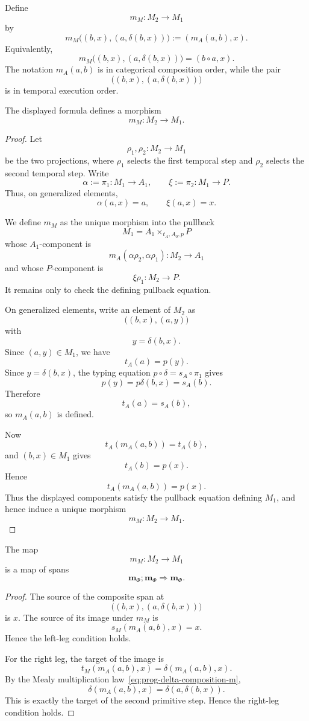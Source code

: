 Define
\[
m_M:M_2\to M_1
\]
by
\[
m_M\bigl((b,x),(a,\delta(b,x))\bigr)
:=
(m_A(a,b),x).
\]
Equivalently,
\[
m_M\bigl((b,x),(a,\delta(b,x))\bigr)
=
(b\circ a,x).
\]
The notation \(m_A(a,b)\) is in categorical composition order, while the pair
\[
\bigl((b,x),(a,\delta(b,x))\bigr)
\]
is in temporal execution order.

\begin{lemma}
\label{lem:program-multiplication-well-defined}
The displayed formula defines a morphism
\[
m_M:M_2\to M_1.
\]
\end{lemma}

\begin{proof}
Let
\[
\rho_1,\rho_2:M_2\to M_1
\]
be the two projections, where \(\rho_1\) selects the first temporal step and \(\rho_2\) selects the second temporal step. Write
\[
\alpha:=\pi_1:M_1\to A_1,
\qquad
\xi:=\pi_2:M_1\to P.
\]
Thus, on generalized elements,
\[
\alpha(a,x)=a,
\qquad
\xi(a,x)=x.
\]

We define \(m_M\) as the unique morphism into the pullback
\[
M_1=A_1\times_{t_A,A_0,p}P
\]
whose \(A_1\)-component is
\[
m_A(\alpha\rho_2,\alpha\rho_1):M_2\to A_1
\]
and whose \(P\)-component is
\[
\xi\rho_1:M_2\to P.
\]
It remains only to check the defining pullback equation.

On generalized elements, write an element of \(M_2\) as
\[
\bigl((b,x),(a,y)\bigr)
\]
with
\[
y=\delta(b,x).
\]
Since \((a,y)\in M_1\), we have
\[
t_A(a)=p(y).
\]
Since \(y=\delta(b,x)\), the typing equation \(p\circ\delta=s_A\circ\pi_1\) gives
\[
p(y)=p\delta(b,x)=s_A(b).
\]
Therefore
\[
t_A(a)=s_A(b),
\]
so \(m_A(a,b)\) is defined.

Now
\[
t_A(m_A(a,b))=t_A(b),
\]
and \((b,x)\in M_1\) gives
\[
t_A(b)=p(x).
\]
Hence
\[
t_A(m_A(a,b))=p(x).
\]
Thus the displayed components satisfy the pullback equation defining \(M_1\), and hence induce a unique morphism
\[
m_M:M_2\to M_1.
\]
\end{proof}

\begin{proposition}
\label{prop:program-multiplication-span-map}
The map
\[
m_M:M_2\to M_1
\]
is a map of spans
\[
\mathbf m_\Phi;\mathbf m_\Phi
\Longrightarrow
\mathbf m_\Phi.
\]
\end{proposition}

\begin{proof}
The source of the composite span at
\[
\bigl((b,x),(a,\delta(b,x))\bigr)
\]
is \(x\). The source of its image under \(m_M\) is
\[
s_M(m_A(a,b),x)=x.
\]
Hence the left-leg condition holds.

For the right leg, the target of the image is
\[
t_M(m_A(a,b),x)
=
\delta(m_A(a,b),x).
\]
By the Mealy multiplication law~\eqref{eq:prog-delta-composition-m},
\[
\delta(m_A(a,b),x)
=
\delta(a,\delta(b,x)).
\]
This is exactly the target of the second primitive step. Hence the right-leg condition holds.
\end{proof}

